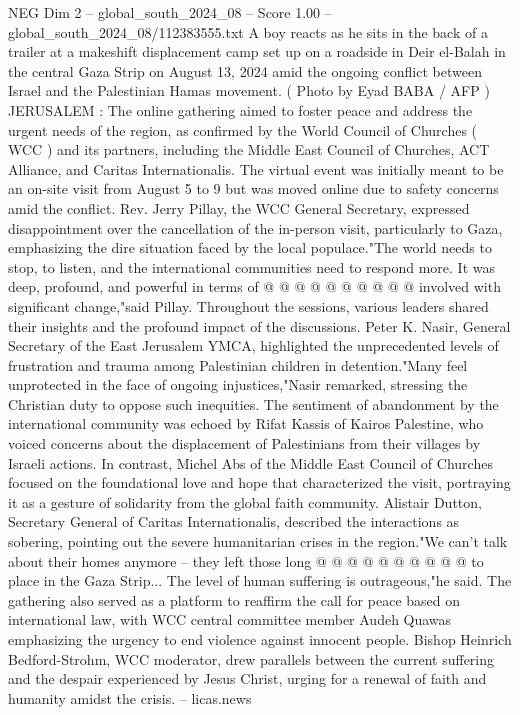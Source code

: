 \begin{textsample}{NEG Dim 2 – global\_south\_2024\_08 – Score 1.00 – global\_south\_2024\_08/112383555.txt}  \label{ex:f2_neg_433}
A boy reacts as he sits in the back of a trailer at a makeshift displacement camp set up on a roadside in Deir el-Balah in the central Gaza Strip on August 13, 2024 amid the ongoing conflict between Israel and the Palestinian Hamas movement. ( Photo by Eyad BABA / AFP ) JERUSALEM : The online gathering aimed to foster peace and address the urgent needs of the region, as confirmed by the World Council of Churches ( WCC ) and its partners, including the Middle East Council of Churches, ACT Alliance, and Caritas Internationalis.
The virtual event was initially meant to be an on-site visit from August 5 to 9 but was moved online due to safety concerns amid the conflict.
Rev.
Jerry Pillay, the WCC General Secretary, expressed disappointment over the cancellation of the in-person visit, particularly to Gaza, emphasizing the dire situation faced by the local populace."The world needs to stop, to listen, and the international communities need to respond more.
It was deep, profound, and powerful in terms of @ @ @ @ @ @ @ @ @ @ involved with significant change,"said Pillay.
Throughout the sessions, various leaders shared their insights and the profound impact of the discussions.
Peter K.
Nasir, General Secretary of the East Jerusalem YMCA, highlighted the unprecedented levels of frustration and trauma among Palestinian children in detention."Many feel unprotected in the face of ongoing injustices,"Nasir remarked, stressing the Christian duty to oppose such inequities.
The sentiment of abandonment by the international community was echoed by Rifat Kassis of Kairos Palestine, who voiced concerns about the displacement of Palestinians from their villages by Israeli actions.
In contrast, Michel Abs of the Middle East Council of Churches focused on the foundational love and hope that characterized the visit, portraying it as a gesture of solidarity from the global faith community.
Alistair Dutton, Secretary General of Caritas Internationalis, described the interactions as sobering, pointing out the severe humanitarian crises in the region."We can't talk about their homes anymore -- they left those long @ @ @ @ @ @ @ @ @ @ to place in the Gaza Strip...
The level of human suffering is outrageous,"he said.
The gathering also served as a platform to reaffirm the call for peace based on international law, with WCC central committee member Audeh Quawas emphasizing the urgency to end violence against innocent people.
Bishop Heinrich Bedford-Strohm, WCC moderator, drew parallels between the current suffering and the despair experienced by Jesus Christ, urging for a renewal of faith and humanity amidst the crisis. -- licas.news

\end{textsample}
